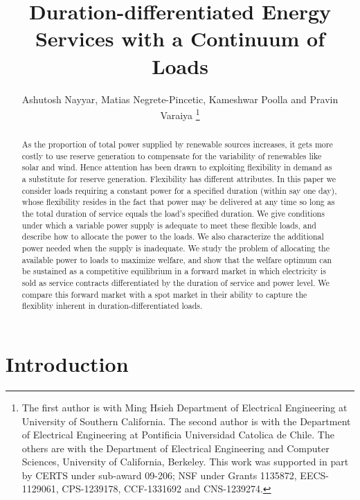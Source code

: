 \documentclass[10pt,draftcls,onecolumn]{IEEEtran}
\newcounter{l1}
\newcounter{l2}
\newcounter{l3}
\begin{document}
\title{
Duration-differentiated Energy Services with a Continuum of Loads}

\author{Ashutosh Nayyar,  Matias Negrete-Pincetic, Kameshwar Poolla and Pravin Varaiya
\thanks{The first author is with Ming Hsieh Department of Electrical Engineering at University of Southern California. The second author is with the Department of Electrical Engineering at Pontificia Universidad Catolica de Chile. The others are with the Department of Electrical Engineering and Computer Sciences, University of California, Berkeley. This work was supported in part by CERTS under sub-award 09-206;  NSF under Grants 1135872, EECS-1129061, CPS-1239178, CCF-1331692 and CNS-1239274.
}}


\maketitle
\thispagestyle{empty}
\pagestyle{plain}




\begin{abstract}
As the proportion of  total power supplied by  renewable sources increases, it gets more costly to use reserve generation to compensate for the  variability of  renewables like solar and wind. Hence  attention has been drawn to exploiting  flexibility in demand as a substitute for reserve generation.  Flexibility has different attributes.  In this paper we consider   loads  requiring a constant power  for a specified duration (within  say one day), whose flexibility resides in the fact that  power may be delivered  at any time  so long as the total duration of service equals the load's specified duration.  We  give conditions under which  a variable power supply is adequate to meet these flexible loads, and describe how to allocate the power to the loads.  We also characterize the  additional power needed when the supply is inadequate.   We study the problem of allocating the available power to loads to maximize welfare, and show that the welfare optimum can be sustained as a competitive equilibrium in a forward market in which electricity  is sold as service contracts differentiated by the duration of service and power level.  We compare this forward market with a spot market in their ability to capture the flexiblity inherent in duration-differentiated loads.
\end{abstract}


\section{Introduction} \label{sec-introduction}
\end{document}
